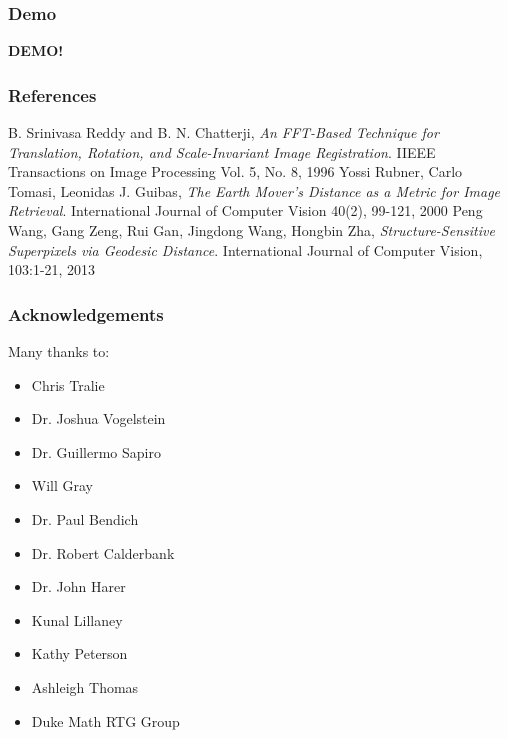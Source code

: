 \documentclass{beamer}
\begin{document}
\begin{frame}
\frametitle{Demo}
\textbf{DEMO!}
\end{frame}

\begin{frame}
\frametitle{References}
\begin{thebibliography}{9}
	B. Srinivasa Reddy and B. N. Chatterji,
	\emph{An FFT-Based Technique for Translation, Rotation, and Scale-Invariant Image Registration}.
	IIEEE Transactions on Image Processing Vol. 5, No. 8, 1996
	Yossi Rubner, Carlo Tomasi, Leonidas J. Guibas,
	\emph{The Earth Mover's Distance as a Metric for Image Retrieval}.
	International Journal of Computer Vision 40(2), 99-121, 2000
	Peng Wang, Gang Zeng, Rui Gan, Jingdong Wang, Hongbin Zha,
	\emph{Structure-Sensitive Superpixels via Geodesic Distance}.
	International Journal of Computer Vision, 103:1-21, 2013
\end{thebibliography} 
\end{frame}

\begin{frame}
\frametitle{Acknowledgements}
Many thanks to:
\begin{itemize}
\item Chris Tralie
\item Dr. Joshua Vogelstein
\item Dr. Guillermo Sapiro
\item Will Gray 
\item Dr. Paul Bendich 
\item Dr. Robert Calderbank
\item Dr. John Harer
\item Kunal Lillaney
\item Kathy Peterson 
\item Ashleigh Thomas 
\item Duke Math RTG Group 
\end{itemize}
\end{frame}
\end{document}
